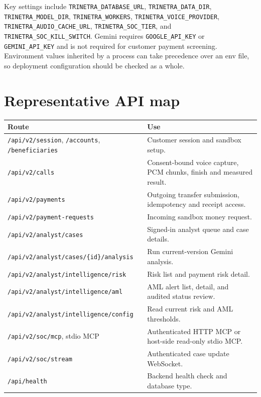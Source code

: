 \documentclass[11pt,a4paper]{article}
\begin{document}
Key settings include \texttt{TRINETRA\_DATABASE\_URL}, \texttt{TRINETRA\_DATA\_DIR}, \texttt{TRINETRA\_MODEL\_DIR}, \texttt{TRINETRA\_WORKERS}, \texttt{TRINETRA\_VOICE\_PROVIDER}, \texttt{TRINETRA\_AUDIO\_CACHE\_URL}, \texttt{TRINETRA\_SOC\_TIER}, and \texttt{TRINETRA\_SOC\_KILL\_SWITCH}. Gemini requires \texttt{GOOGLE\_API\_KEY} or \texttt{GEMINI\_API\_KEY} and is not required for customer payment screening. Environment values inherited by a process can take precedence over an env file, so deployment configuration should be checked as a whole.

\section{Representative API map}
\begin{tabularx}{\linewidth}{@{}lX@{}}
\toprule
Route & Use \\
\midrule
\texttt{/api/v2/session}, \texttt{/accounts}, \texttt{/beneficiaries} & Customer session and sandbox setup. \\
\texttt{/api/v2/calls} & Consent-bound voice capture, PCM chunks, finish and measured result. \\
\texttt{/api/v2/payments} & Outgoing transfer submission, idempotency and receipt access. \\
\texttt{/api/v2/payment-requests} & Incoming sandbox money request. \\
\texttt{/api/v2/analyst/cases} & Signed-in analyst queue and case details. \\
\texttt{/api/v2/analyst/cases/\{id\}/analysis} & Run current-version Gemini analysis. \\
\texttt{/api/v2/analyst/intelligence/risk} & Risk list and payment risk detail. \\
\texttt{/api/v2/analyst/intelligence/aml} & AML alert list, detail, and audited status review. \\
\texttt{/api/v2/analyst/intelligence/config} & Read current risk and AML thresholds. \\
\texttt{/api/v2/soc/mcp}, stdio MCP & Authenticated HTTP MCP or host-side read-only stdio MCP. \\
\texttt{/api/v2/soc/stream} & Authenticated case update WebSocket. \\
\texttt{/api/health} & Backend health check and database type. \\
\bottomrule
\end{tabularx}
\end{document}
